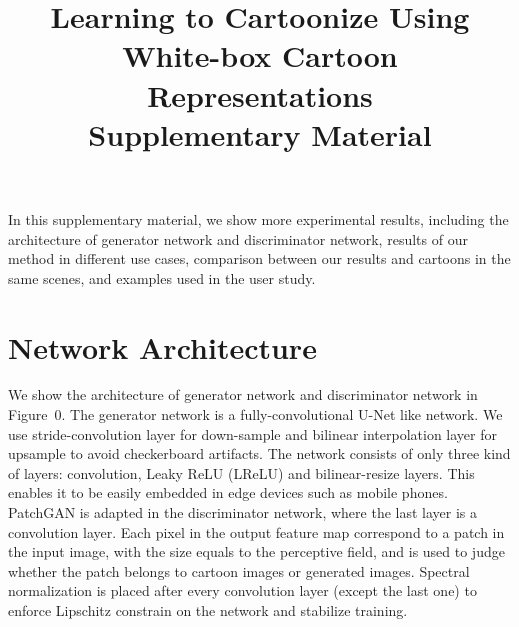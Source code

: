 \documentclass[10pt,twocolumn,letterpaper]{article}
\begin{document}



\title{Learning to Cartoonize Using White-box Cartoon Representations\\Supplementary Material}



In this supplementary material, we show more experimental results, including the architecture of generator network and discriminator network, results of our method in different use cases, comparison between our results and cartoons in the same scenes, and examples used in the user study.

\section{Network Architecture}
We show the architecture of generator network and discriminator network in Figure~0. The generator network is a fully-convolutional U-Net \cite{ronneberger2015u} like network. We use stride-convolution layer for down-sample and bilinear interpolation layer for upsample to avoid checkerboard artifacts. The network consists of only three kind of layers: convolution,  Leaky ReLU (LReLU) \cite{maas2013rectifier} and bilinear-resize layers. This enables it to be easily embedded in edge devices such as mobile phones. PatchGAN \cite{isola2017image} is adapted in the discriminator network, where the last layer is a convolution layer. Each pixel in the output feature map correspond to a patch in the input image, with the size equals to the perceptive field, and is used to judge whether the patch belongs to cartoon images or generated images. Spectral normalization \cite{miyato2018spectral} is placed after every convolution layer (except the last one) to enforce Lipschitz constrain on the network and stabilize training. 
\end{document}

